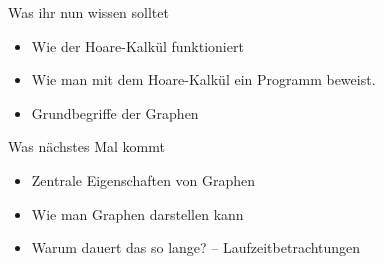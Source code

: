 \begin{frame}	
	\begin{block}{Was ihr nun wissen solltet}
		\begin{itemize}
			\item Wie der Hoare-Kalkül funktioniert %
			\item Wie man mit dem Hoare-Kalkül ein Programm beweist.
			\item Grundbegriffe der Graphen
		\end{itemize}
	\end{block}
	
	\begin{block}{Was nächstes Mal kommt}
		\begin{itemize}
			\item Zentrale Eigenschaften von Graphen
			\item Wie man Graphen darstellen kann
			\item Warum dauert das so lange? -- Laufzeitbetrachtungen
		\end{itemize}
	\end{block}
\end{frame}

\slideThanks

